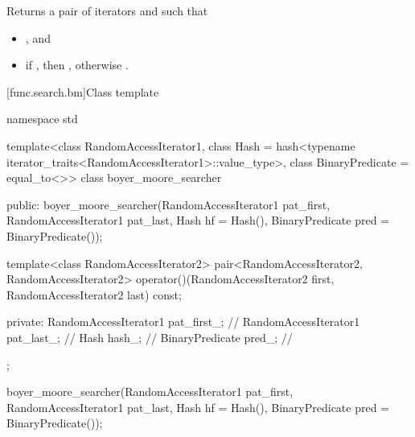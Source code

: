 \begin{itemdescr}
\pnum
\effects
Returns a pair of iterators  and  such that
\begin{itemize}
\item {}, and
\item if , then ,
otherwise .
\end{itemize}
\end{itemdescr}

[func.search.bm]{Class template }

%
\begin{codeblock}
namespace std {
  template<class RandomAccessIterator1,
           class Hash = hash<typename iterator_traits<RandomAccessIterator1>::value_type>,
           class BinaryPredicate = equal_to<>>
  class boyer_moore_searcher {
  public:
    boyer_moore_searcher(RandomAccessIterator1 pat_first,
                         RandomAccessIterator1 pat_last,
                         Hash hf = Hash(),
                         BinaryPredicate pred = BinaryPredicate());

    template<class RandomAccessIterator2>
      pair<RandomAccessIterator2, RandomAccessIterator2>
        operator()(RandomAccessIterator2 first, RandomAccessIterator2 last) const;

  private:
    RandomAccessIterator1 pat_first_;   // \expos
    RandomAccessIterator1 pat_last_;    // \expos
    Hash hash_;                         // \expos
    BinaryPredicate pred_;              // \expos
  };
}
\end{codeblock}

%
\begin{itemdecl}
boyer_moore_searcher(RandomAccessIterator1 pat_first,
                     RandomAccessIterator1 pat_last,
                     Hash hf = Hash(),
                     BinaryPredicate pred = BinaryPredicate());
\end{itemdecl}

